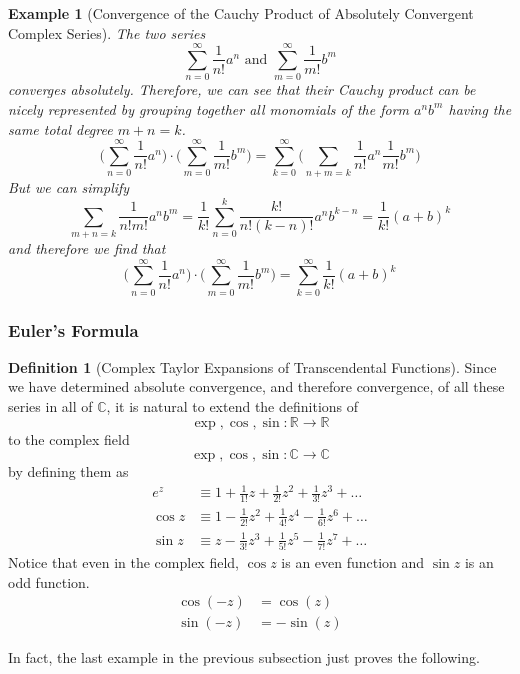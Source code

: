 \documentclass{article}
\newtheorem{example}{Example}[section]
\theoremstyle{remark}
\theoremstyle{definition}
\newtheorem{definition}{Definition}[section]
\begin{document}
\begin{example}[Convergence of the Cauchy Product of Absolutely Convergent Complex Series]
The two series 
\[\sum_{n = 0}^\infty \frac{1}{n!} a^n \text{ and } \sum_{m = 0}^\infty \frac{1}{m!} b^m\]
converges absolutely. Therefore, we can see that their Cauchy product can be nicely represented by grouping together all monomials of the form $a^n b^m$ having the same total degree $m + n = k$. 
\[\bigg( \sum_{n = 0}^\infty \frac{1}{n!} a^n \bigg) \cdot \bigg( \sum_{m = 0}^\infty \frac{1}{m!} b^m \bigg) = \sum_{k=0}^\infty \bigg(\sum_{n+m=k} \frac{1}{n!} a^n \frac{1}{m!} b^m \bigg)\]
But we can simplify 
\[\sum_{m + n = k} \frac{1}{n! m!} a^n b^m = \frac{1}{k!} \sum_{n=0}^k \frac{k!}{n! (k-n)!} a^n b^{k-n} = \frac{1}{k!} (a + b)^k\]
and therefore we find that 
\[\bigg( \sum_{n = 0}^\infty \frac{1}{n!} a^n \bigg) \cdot \bigg( \sum_{m = 0}^\infty \frac{1}{m!} b^m \bigg) = \sum_{k=0}^\infty \frac{1}{k!} (a + b)^k\]
\end{example}

\subsubsection{Euler's Formula}

\begin{definition}[Complex Taylor Expansions of Transcendental Functions]
Since we have determined absolute convergence, and therefore convergence, of all these series in all of $\mathbb{C}$, it is natural to extend the definitions of 
\[\exp, \cos, \sin: \mathbb{R} \longrightarrow \mathbb{R}\]
to the complex field 
\[\exp, \cos, \sin: \mathbb{C} \longrightarrow \mathbb{C}\]
by defining them as 
\begin{align*}
    e^z & \equiv 1 + \frac{1}{1!}z + \frac{1}{2!} z^2 + \frac{1}{3!} z^3 + \ldots \\
    \cos{z} & \equiv 1 - \frac{1}{2!} z^2 + \frac{1}{4!} z^4 - \frac{1}{6!} z^6 + \ldots \\
    \sin{z} & \equiv z - \frac{1}{3!} z^3 + \frac{1}{5!} z^5 - \frac{1}{7!} z^7 + \ldots
\end{align*}
Notice that even in the complex field, $\cos{z}$ is an even function and $\sin{z}$ is an odd function. 
\begin{align*}
    \cos(-z) & = \cos(z) \\
    \sin(-z) & = -\sin(z)
\end{align*}
\end{definition}

In fact, the last example in the previous subsection just proves the following. 
\end{document}
